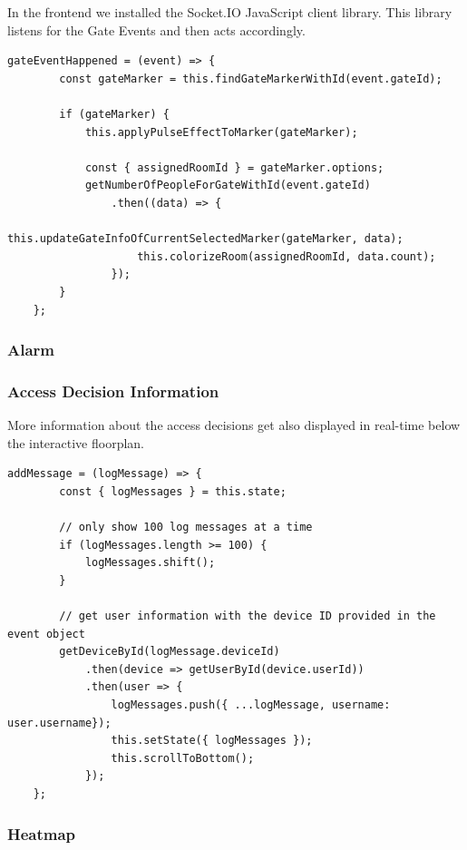 In the frontend we installed the Socket.IO JavaScript client library. This library listens for the Gate Events and then acts accordingly.



\begin{lstlisting}[label=gateEventHappened]
gateEventHappened = (event) => {
        const gateMarker = this.findGateMarkerWithId(event.gateId);

        if (gateMarker) {
            this.applyPulseEffectToMarker(gateMarker);

            const { assignedRoomId } = gateMarker.options;
            getNumberOfPeopleForGateWithId(event.gateId)
                .then((data) => {
                    this.updateGateInfoOfCurrentSelectedMarker(gateMarker, data);
                    this.colorizeRoom(assignedRoomId, data.count);
                });
        }
    };
\end{lstlisting}

\subsubsection{Alarm}

\subsubsection{Access Decision Information}

More information about the access decisions get also displayed in real-time below the interactive floorplan.

\begin{lstlisting}[label=addMessage]
addMessage = (logMessage) => {
        const { logMessages } = this.state;
        
        // only show 100 log messages at a time
        if (logMessages.length >= 100) {
            logMessages.shift();
        }

		// get user information with the device ID provided in the event object
        getDeviceById(logMessage.deviceId)
            .then(device => getUserById(device.userId))
            .then(user => {
                logMessages.push({ ...logMessage, username: user.username});
                this.setState({ logMessages });
                this.scrollToBottom();
            });
    };
\end{lstlisting}
    

\subsubsection{Heatmap}

